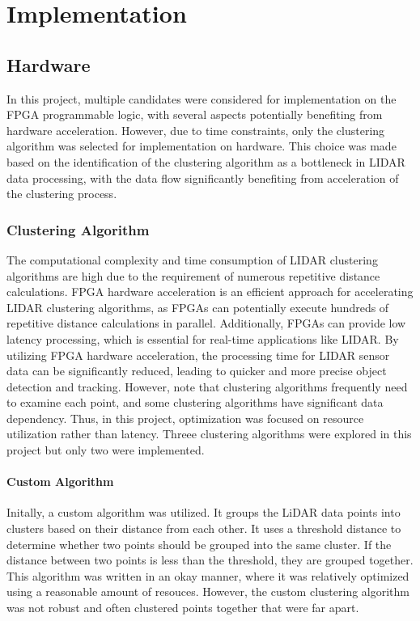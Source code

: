 \documentclass[journal]{IEEEtran} %
\begin{document}
\section{Implementation}

\subsection{Hardware}
In this project, multiple candidates were considered for implementation on the FPGA programmable logic, with several aspects potentially benefiting from hardware acceleration. However, due to time constraints, only the clustering algorithm was selected for implementation on hardware. This choice was made based on the identification of the clustering algorithm as a bottleneck in LIDAR data processing, with the data flow significantly benefiting from acceleration of the clustering process.\\

\subsubsection{Clustering Algorithm}
The computational complexity and time consumption of LIDAR clustering algorithms are high due to the requirement of numerous repetitive distance calculations. FPGA hardware acceleration is an efficient approach for accelerating LIDAR clustering algorithms, as FPGAs can potentially execute hundreds of repetitive distance calculations in parallel. Additionally, FPGAs can provide low latency processing, which is essential for real-time applications like LIDAR. By utilizing FPGA hardware acceleration, the processing time for LIDAR sensor data can be significantly reduced, leading to quicker and more precise object detection and tracking. However, note that clustering algorithms frequently need to examine each point, and some clustering algorithms have significant data dependency. Thus, in this project, optimization was focused on resource utilization rather than latency. Threee clustering algorithms were explored in this project but only two were implemented.\\

\paragraph{Custom Algorithm}
Initally, a custom algorithm was utilized. It groups the LiDAR data points into clusters based on their distance from each other. It uses a threshold distance to determine whether two points should be grouped into the same cluster. If the distance between two points is less than the threshold, they are grouped together. This algorithm was written in an okay manner, where it was relatively optimized using a reasonable amount of resouces. However, the custom clustering algorithm was not robust and often clustered points together that were far apart.\\
\end{document}
